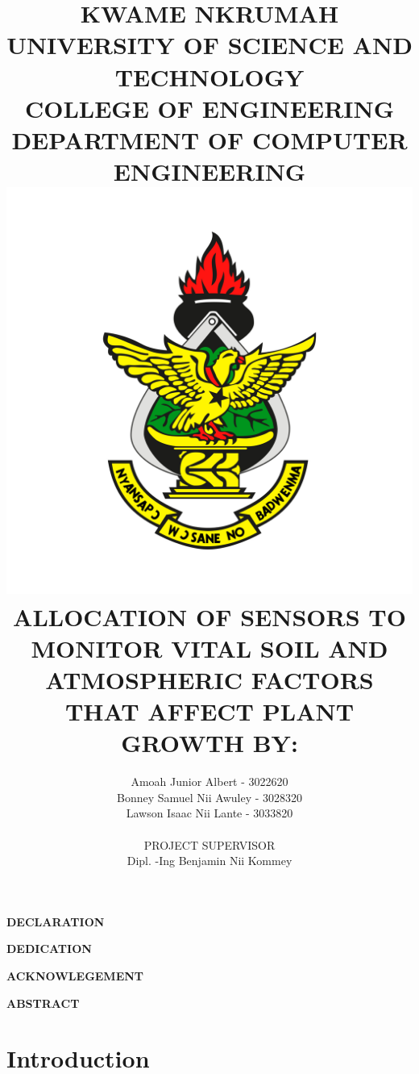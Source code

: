 \documentclass[12pt, a4paper]{article}
\title{KWAME NKRUMAH UNIVERSITY OF SCIENCE AND TECHNOLOGY\\
COLLEGE OF ENGINEERING\\
DEPARTMENT OF COMPUTER ENGINEERING\\ 
\includegraphics[scale=0.4]{knust} 
\\ALLOCATION OF SENSORS TO MONITOR VITAL SOIL AND ATMOSPHERIC FACTORS THAT AFFECT PLANT GROWTH BY:}
\author{Amoah Junior Albert - 3022620\\ Bonney Samuel Nii Awuley - 3028320 \\ Lawson Isaac Nii Lante - 3033820 \\ \\ PROJECT SUPERVISOR\\ Dipl. -Ing Benjamin Nii Kommey}
\begin{document}
\maketitle
\thispagestyle{empty}
\newpage

\begin{center}
\textbf{DECLARATION}
\end{center}
\newpage

\begin{center}
\textbf{DEDICATION}
\end{center}
\newpage

\begin{center}
\textbf{ACKNOWLEGEMENT}
\end{center}
\newpage

\begin{center}
\textbf{ABSTRACT}
\end{center}
\newpage


\tableofcontents
\newpage
{}
\section{Introduction}
\end{document}
